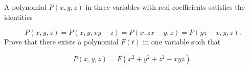 A polynomial $P(x, y, z)$ in three variables with real coefficients satisfies the identities

$$P(x, y, z)=P(x, y, xy-z)=P(x, zx-y, z)=P(yz-x, y, z).$$
Prove that there exists a polynomial $F(t)$ in one variable such that

$$P(x,y,z)=F(x^2+y^2+z^2-xyz).$$